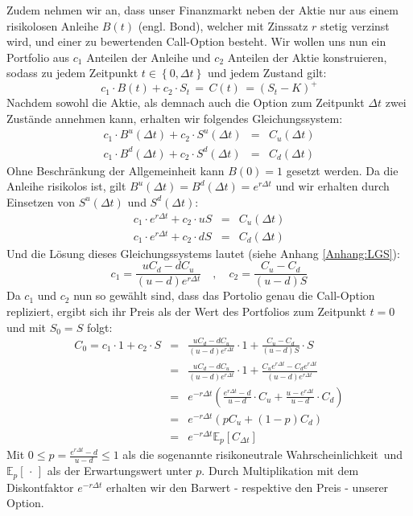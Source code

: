 Zudem nehmen wir an, dass unser Finanzmarkt neben der Aktie nur aus einem risikolosen Anleihe $B(t)$ (engl. Bond), welcher mit Zinssatz $r$ stetig verzinst wird, und einer zu bewertenden Call-Option besteht. Wir wollen uns nun ein Portfolio aus $c_1$ Anteilen der Anleihe und $c_2$ Anteilen der Aktie konstruieren, sodass zu jedem Zeitpunkt $ t \in \left\{0,\Delta t\right\} $ und jedem Zustand gilt:
\begin{equation*}
c_1 \cdot B(t) + c_2 \cdot S_t \, = \,C(t) \, = \left(S_t - K \right) ^+ 
\end{equation*}
Nachdem sowohl die Aktie, als demnach auch die Option zum Zeitpunkt $\Delta t$ zwei Zustände annehmen kann, erhalten wir folgendes Gleichungssystem:
\begin{eqnarray*}
c_1 \cdot B^u(\Delta t) + c_2 \cdot S^u(\Delta t) & = & C_u(\Delta t) \\
c_1 \cdot B^d(\Delta t) + c_2 \cdot S^d(\Delta t) & = & C_d(\Delta t)
\end{eqnarray*}
Ohne Beschränkung der Allgemeinheit kann $B(0) = 1$ gesetzt werden. Da die Anleihe risikolos ist, gilt $B^u(\Delta t) = B^d(\Delta t) = e^{r\Delta t}$ und wir erhalten durch Einsetzen von $S^u(\Delta t)$ und $S^d(\Delta t)$:
\begin{eqnarray}
c_1 \cdot e^{r\Delta t} + c_2 \cdot uS & = & C_u(\Delta t) \nonumber \label{Bin:gleichungssystem} \\
c_1 \cdot e^{r\Delta t} + c_2 \cdot dS & = & C_d(\Delta t)  
\end{eqnarray}
Und die Lösung dieses Gleichungssystems lautet (siehe Anhang \ref{Anhang:LGS}):
\[
		c_1 = \frac{uC_d - dC_u}{(u - d)e^{r\Delta t}} \quad , \quad c_2 = \frac{C_u - C_d}{(u-d)S}  
\]
Da $c_1$ und $c_2$ nun so gewählt sind, dass das Portolio genau die Call-Option repliziert, ergibt sich ihr Preis als der Wert des Portfolios zum Zeitpunkt $t=0$ und mit $S_0 = S$ folgt:
\begin{eqnarray}    
C_0  = c_1 \cdot 1 + c_2 \cdot S    & = & \frac{uC_d - dC_u}{(u - d)e^{r\Delta t}} \cdot 1 + \frac{C_u - C_d}{(u-d)S} \cdot S \nonumber \\
                                    & = & \frac{uC_d - dC_u}{(u - d)e^{r\Delta t}} \cdot 1 + \frac{C_ue^{r\Delta t} - C_de^{r\Delta t}}{(u-d)e^{r\Delta t}} \nonumber \\ 
                                    & = & e^{-r\Delta t} \left( \frac{e^{r\Delta t} - d}{u-d} \cdot C_u + \frac{u - e^{r\Delta t}}{u-d}\cdot C_d\right) \nonumber \\
                                    & = & e^{-r\Delta t}\left(pC_u + (1-p)C_d\right) \nonumber \\ 
		  	 	 				  & = & e^{-r\Delta t} \mathbb{E}_p\left[C_{\Delta t}\right] \label{BIN:1PeriodenCall}
\end{eqnarray}
Mit $ 0 \leq p = \frac{e^{r\Delta t} - d}{u-d} \leq 1 $ als die sogenannte \glqq risikoneutrale Wahrscheinlichkeit\grqq\, und $\mathbb{E}_p\left[ \,\cdot\, \right]$ als der Erwartungswert unter $p$. Durch Multiplikation mit dem Diskontfaktor $e^{-r\Delta t}$ erhalten wir den Barwert - respektive den Preis - unserer Option.


